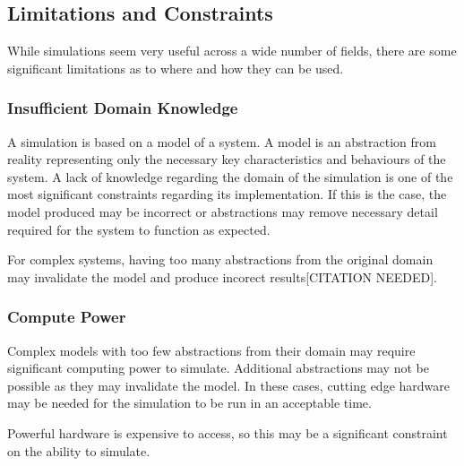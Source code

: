 \documentclass{UoYCSproject}
\begin{document}
\subsection{Limitations and Constraints}
While simulations seem very useful across a wide number of fields, there are some significant limitations as to where and how they can be used.

\subsubsection{Insufficient Domain Knowledge}
\label{domain_knowledge}
A simulation is based on a model of a system. A model is an abstraction from reality representing only the necessary key characteristics and behaviours of the system. A lack of knowledge regarding the domain of the simulation is one of the most significant constraints regarding its implementation. If this is the case, the model produced may be incorrect or abstractions may remove necessary detail required for the system to function as expected.%

For complex systems, having too many abstractions from the original domain may invalidate the model and produce incorect results[CITATION NEEDED].

\subsubsection{Compute Power}
Complex models with too few abstractions from their domain may require significant computing power to simulate. Additional abstractions may not be possible as they may invalidate the model. In these cases, cutting edge hardware may be needed for the simulation to be run in an acceptable time. 


Powerful hardware is expensive to access, so this may be a significant constraint on the ability to simulate.


\end{document}
